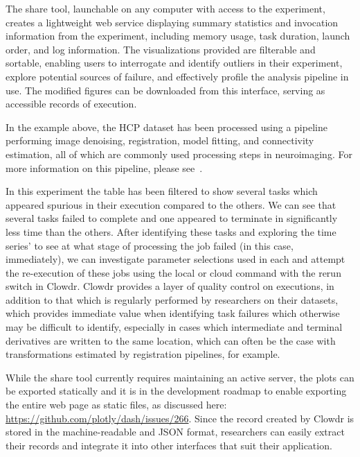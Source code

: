 \documentclass[fleqn,12pt]{SelfArx_ch} %
\begin{document}
The share tool, launchable on any computer with access to the experiment, creates a lightweight web service displaying
summary statistics and invocation information from the experiment, including memory usage, task duration, launch order,
and log information. The visualizations provided are filterable and sortable, enabling users to interrogate and
identify outliers in their experiment, explore potential sources of failure, and effectively profile the analysis
pipeline in use. The modified figures can be downloaded from this interface, serving as accessible records of
execution.

In the example above, the HCP dataset has been processed using a pipeline performing image denoising, registration,
model fitting, and connectivity estimation, all of which are commonly used processing steps in neuroimaging. For more
information on this pipeline, please see~\cite{Kiar2018-lz}.

In this experiment the table has been filtered to show several tasks which appeared spurious in their execution
compared to the others. We can see that several tasks failed to complete and one appeared to terminate in significantly
less time than the others. After identifying these tasks and exploring the time series’ to see at what stage of
processing the job failed (in this case, immediately), we can investigate parameter selections used in each and attempt
the re-execution of these jobs using the local or cloud command with the rerun switch in Clowdr. Clowdr provides a
layer of quality control on executions, in addition to that which is regularly performed by researchers on their
datasets, which provides immediate value when identifying task failures which otherwise may be difficult to identify,
especially in cases which intermediate and terminal derivatives are written to the same location, which can often be
the case with transformations estimated by registration pipelines, for example.

While the share tool currently requires maintaining an active server, the plots can be exported statically and it is in
the development roadmap to enable exporting the entire web page as static files, as discussed here:
\url{https://github.com/plotly/dash/issues/266}. Since the record created by Clowdr is stored in the machine-readable
and JSON format, researchers can easily extract their records and integrate it into other interfaces that suit their
application.
\end{document}
